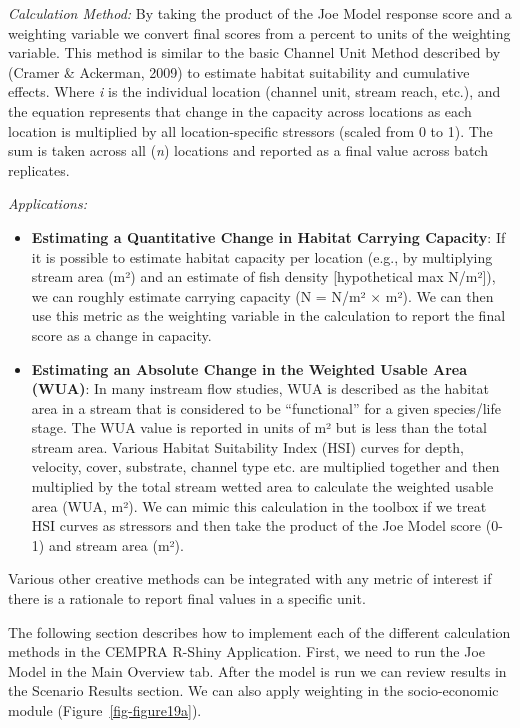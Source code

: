 \documentclass[
  letterpaper,
  DIV=11,
  numbers=noendperiod]{scrreprt}
\begin{document}
\emph{Calculation Method:} By taking the product of the Joe Model
response score and a weighting variable we convert final scores from a
percent to units of the weighting variable. This method is similar to
the basic Channel Unit Method described by (Cramer \& Ackerman, 2009) to
estimate habitat suitability and cumulative effects. Where \emph{i} is
the individual location (channel unit, stream reach, etc.), and the
equation represents that change in the capacity across locations as each
location is multiplied by all location-specific stressors (scaled from 0
to 1). The sum is taken across all (\emph{n}) locations and reported as
a final value across batch replicates.

\emph{Applications:}

\begin{itemize}
\item
  \textbf{Estimating a Quantitative Change in Habitat Carrying
  Capacity}: If it is possible to estimate habitat capacity per location
  (e.g., by multiplying stream area (m²) and an estimate of fish density
  {[}hypothetical max N/m²{]}), we can roughly estimate carrying
  capacity (N = N/m² × m²). We can then use this metric as the weighting
  variable in the calculation to report the final score as a change in
  capacity.
\item
  \textbf{Estimating an Absolute Change in the Weighted Usable Area
  (WUA)}: In many instream flow studies, WUA is described as the habitat
  area in a stream that is considered to be ``functional'' for a given
  species/life stage. The WUA value is reported in units of m² but is
  less than the total stream area. Various Habitat Suitability Index
  (HSI) curves for depth, velocity, cover, substrate, channel type etc.
  are multiplied together and then multiplied by the total stream wetted
  area to calculate the weighted usable area (WUA, m²). We can mimic
  this calculation in the toolbox if we treat HSI curves as stressors
  and then take the product of the Joe Model score (0-1) and stream area
  (m²).
\end{itemize}

Various other creative methods can be integrated with any metric of
interest if there is a rationale to report final values in a specific
unit.

The following section describes how to implement each of the different
calculation methods in the CEMPRA R-Shiny Application. First, we need to
run the Joe Model in the Main Overview tab. After the model is run we
can review results in the Scenario Results section. We can also apply
weighting in the socio-economic module (Figure~\ref{fig-figure19a}).
\end{document}

